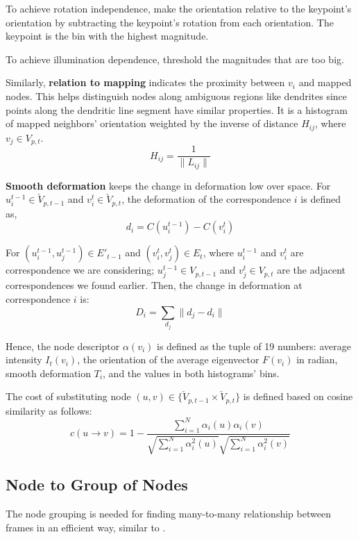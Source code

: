 \documentclass{article}
\begin{document}
To achieve rotation independence, make the orientation relative to the keypoint's orientation by subtracting the keypoint's rotation from each orientation. The keypoint is the bin with the highest magnitude.

To achieve illumination dependence, threshold the magnitudes that are too big.

Similarly, \textbf{relation to mapping} indicates the proximity between $v_i$ and mapped nodes. This helps distinguish nodes along ambiguous regions like dendrites since points along the dendritic line segment have similar properties. It is a histogram of mapped neighbors' orientation weighted by the inverse of distance $H_{ij}$, where $v_j \in V_{p,t}$.
\begin{equation}
H_{ij} = \frac{1}{ \| L_{ij} \| }
\end{equation}

\textbf{Smooth deformation} keeps the change in deformation low over space. For $u_i^{t-1} \in \check{V}_{p,t-1}$ and $v_i^t \in \check{V}_{p,t}$, the deformation of the correspondence $i$ is defined as,
\begin{equation}
d_i = C(u_i^{t-1}) - C(v_i^t)
\end{equation}

For $(u_i^{t-1}, u_j^{t-1}) \in E'_{t-1}$ and $(v_i^t, v_j^t) \in E_t$, where $u_i^{t-1}$ and $v_i^t$ are correspondence we are considering; $u_j^{t-1} \in V_{p,t-1}$ and $v_j^t \in  V_{p,t}$ are the adjacent correspondences we found earlier. Then, the change in deformation at correspondence $i$ is:
\begin{equation}
D_i = \sum_{d_j} \| d_j - d_i \|
\end{equation}

Hence, the node descriptor $\alpha(v_i)$ is defined as the tuple of 19 numbers: average intensity $I_t(v_i)$, the orientation of the average eigenvector $F(v_i)$ in radian, smooth deformation $T_i$, and the values in both histograms' bins.

The cost of substituting node $(u,v) \in \{ \check{V}_{p,t-1} \times \check{V}_{p,t} \}$ is defined based on cosine similarity as follows:
\begin{equation}
c(u \rightarrow v) = 1 - \frac{\sum_{i=1}^N \alpha_i(u)\alpha_i(v)}{\sqrt{\sum_{i=1}^N \alpha_i^2(u)}\sqrt{\sum_{i=1}^N \alpha_i^2(v)}}
\end{equation}


\subsection{Node to Group of Nodes}
The node grouping is needed for finding many-to-many relationship between frames in an efficient way, similar to \cite{Morrison2015}.
\end{document}
